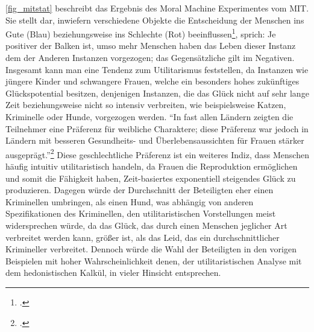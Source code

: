 \documentclass[a4paper, 12pt, openany]{book}
\newcommand\Subsection[2]{\subsection[#1 {\scriptsize\itshape#2}]{#1 \footnotesize\itshape#2}}
\begin{document}
                \autoref{fig_mitstat} beschreibt das Ergebnis des Moral Machine Experimentes vom MIT. Sie stellt dar, inwiefern verschiedene Objekte die Entscheidung der Menschen ins Gute (Blau) beziehungsweise ins Schlechte (Rot) beeinflussen\footcite[61]{awad2018moral}, sprich: Je positiver der Balken ist, umso mehr Menschen haben das Leben dieser Instanz dem der Anderen Instanzen vorgezogen; das Gegensätzliche gilt im Negativen. Insgesamt kann man eine Tendenz zum Utilitarismus feststellen, da Instanzen wie jüngere Kinder und schwangere Frauen, welche ein besonders hohes zukünftiges Glückspotential besitzen, denjenigen Instanzen, die das Glück nicht auf sehr lange Zeit beziehungsweise nicht so intensiv verbreiten, wie beispielsweise Katzen, Kriminelle oder Hunde, vorgezogen werden. \enquote{In fast allen Ländern zeigten die Teilnehmer eine Präferenz für weibliche Charaktere; diese Präferenz war jedoch in Ländern mit besseren Gesundheits- und Überlebensaussichten für Frauen stärker ausgeprägt.}\footcite[63]{awad2018moral} Diese geschlechtliche Präferenz ist ein weiteres Indiz, dass Menschen häufig intuitiv utilitaristisch handeln, da Frauen die Reproduktion ermöglichen und somit die Fähigkeit haben, Zeit-basiertes exponentiell steigendes Glück zu produzieren. Dagegen würde der Durchschnitt der Beteiligten eher einen Kriminellen umbringen, als einen Hund, was abhängig von anderen Spezifikationen des Kriminellen, den utilitaristischen Vorstellungen meist widersprechen würde, da das Glück, das durch einen Menschen jeglicher Art verbreitet werden kann, größer ist, als das Leid, das ein durchschnittlicher Krimineller verbreitet. Dennoch würde die Wahl der Beteiligten in den vorigen Beispielen mit hoher Wahrscheinlichkeit denen, der utilitaristischen Analyse mit dem hedonistischen Kalkül, in vieler Hinsicht entsprechen.
            
    
\end{document}
